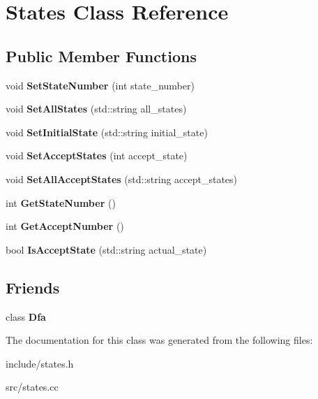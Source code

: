 \hypertarget{classStates}{}\section{States Class Reference}
\label{classStates}
\subsection*{Public Member Functions}
\begin{DoxyCompactItemize}
\item 
\mbox{\label{classStates_a5a2bc9b7cc865d41d22d46f3171942c8}} 
void {\bfseries Set\+State\+Number} (int state\+\_\+number)
\item 
\mbox{\label{classStates_ac84bd2eaecd487ec1ec5f935810262bd}} 
void {\bfseries Set\+All\+States} (std\+::string all\+\_\+states)
\item 
\mbox{\label{classStates_a5a59b1d5e57a4a77053521c180259328}} 
void {\bfseries Set\+Initial\+State} (std\+::string initial\+\_\+state)
\item 
\mbox{\label{classStates_ac3038ae4bc800dd96e8f71186f3badbf}} 
void {\bfseries Set\+Accept\+States} (int accept\+\_\+state)
\item 
\mbox{\label{classStates_a69e75840154231517b78ef9e6fcedfc1}} 
void {\bfseries Set\+All\+Accept\+States} (std\+::string accept\+\_\+states)
\item 
\mbox{\label{classStates_a4e73e71b7f53665abbfd154b72f39d08}} 
int {\bfseries Get\+State\+Number} ()
\item 
\mbox{\label{classStates_a77328d7648bbe13bf6eada96850b444c}} 
int {\bfseries Get\+Accept\+Number} ()
\item 
\mbox{\label{classStates_a00c6a25604f801935f924ef5c89b3eda}} 
bool {\bfseries Is\+Accept\+State} (std\+::string actual\+\_\+state)
\end{DoxyCompactItemize}
\subsection*{Friends}
\begin{DoxyCompactItemize}
\item 
\mbox{\label{classStates_a21ab7f6ff9e8704242e18ecfde24a901}} 
class {\bfseries Dfa}
\end{DoxyCompactItemize}


The documentation for this class was generated from the following files\+:\begin{DoxyCompactItemize}
\item 
include/states.\+h\item 
src/states.\+cc\end{DoxyCompactItemize}
